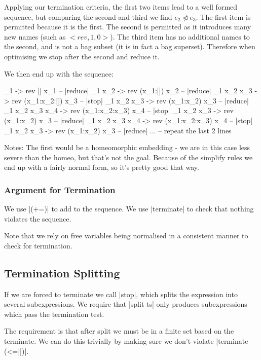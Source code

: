 \documentclass[draft]{sigplanconf}
\begin{document}
Applying our termination criteria, the first two items lead to a well formed sequence, but comparing the second and third we find $e_2 \ntriangleleft e_3$. The first item is permitted because it is the first. The second is permitted as it introduces many new names (such as $<rev,1,0>$). The third item has no additional names to the second, and is not a bag subset (it is in fact a bag superset). Therefore when optimising we stop after the second and reduce it.

We then end up with the sequence:

\begin{code}
\x_1 -> rev [] x_1                          -- |reduce|
\x_1 x_2 -> rev (x_1:[]) x_2                -- |reduce|
\x_1 x_2 x_3 -> rev (x_1:x_2:[]) x_3        -- |stop|
\x_1 x_2 x_3 -> rev (x_1:x_2) x_3           -- |reduce|
\x_1 x_2 x_3 x_4 -> rev (x_1:x_2:x_3) x_4   -- |stop|
\x_1 x_2 x_3 -> rev (x_1:x_2) x_3           -- |reduce|
\x_1 x_2 x_3 x_4 -> rev (x_1:x_2:x_3) x_4   -- |stop|
\x_1 x_2 x_3 -> rev (x_1:x_2) x_3           -- |reduce|
... -- repeat the last 2 lines
\end{code}

Notes: The first would be a homeomorphic embedding - we are in this case less severe than the homeo, but that's not the goal. Because of the simplify rules we end up with a fairly normal form, so it's pretty good that way.


\subsubsection{Argument for Termination}

We use |(+=)| to add to the sequence. We use |terminate| to check that nothing violates the sequence.

Note that we rely on free variables being normalised in a consistent manner to check for termination.

\subsection{Termination Splitting}
\label{sec:term_split}

If we are forced to terminate we call |stop|, which splits the expression into several subexpressions. We require that |split ts| only produces subexpressions which pass the termination test.

The requirement is that after split we must be in a finite set based on the terminate. We can do this trivially by making sure we don't violate |terminate (<=||)|.
\end{document}
